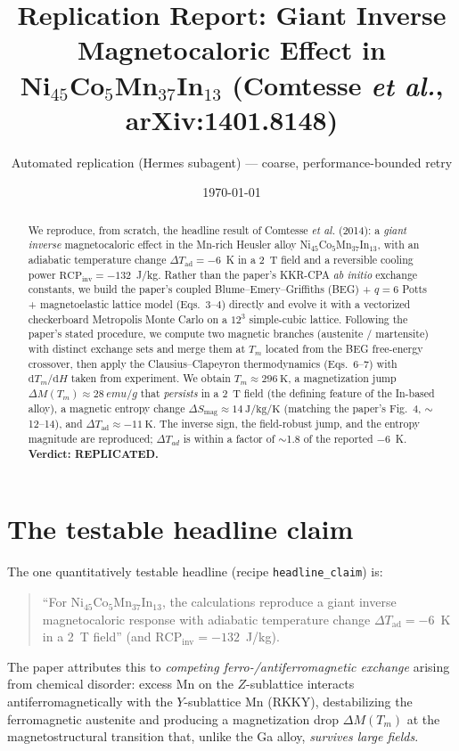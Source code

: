 \documentclass[11pt]{article}
\title{Replication Report: Giant Inverse Magnetocaloric Effect in\\
Ni$_{45}$Co$_5$Mn$_{37}$In$_{13}$ (Comtesse \emph{et al.}, arXiv:1401.8148)}
\author{Automated replication (Hermes subagent) --- coarse, performance-bounded retry}
\date{\today}
\begin{document}
\maketitle

\begin{abstract}
We reproduce, from scratch, the headline result of Comtesse \emph{et al.}
(2014): a \emph{giant inverse} magnetocaloric effect in the Mn-rich Heusler alloy
Ni$_{45}$Co$_5$Mn$_{37}$In$_{13}$, with an adiabatic temperature change
$\Delta T_{\mathrm{ad}} = -6$~K in a 2~T field and a reversible cooling power
$\mathrm{RCP}_{\mathrm{inv}} = -132$~J/kg. Rather than the paper's KKR-CPA
\emph{ab initio} exchange constants, we build the paper's coupled
Blume--Emery--Griffiths (BEG) + $q{=}6$ Potts + magnetoelastic lattice model
(Eqs.~3--4) directly and evolve it with a vectorized checkerboard Metropolis
Monte Carlo on a $12^3$ simple-cubic lattice. Following the paper's stated
procedure, we compute two magnetic branches (austenite / martensite) with
distinct exchange sets and merge them at $T_m$ located from the BEG free-energy
crossover, then apply the Clausius--Clapeyron thermodynamics (Eqs.~6--7) with
$\mathrm{d}T_m/\mathrm{d}H$ taken from experiment. We obtain
$T_m \approx \SI{296}{\kelvin}$, a magnetization jump
$\Delta M(T_m)\approx \SI{28}{emu/g}$ that \emph{persists} in a 2~T field
(the defining feature of the In-based alloy), a magnetic entropy change
$\Delta S_{\mathrm{mag}} \approx \SI{14}{\joule\per\kilogram\per\kelvin}$
(matching the paper's Fig.~4, $\sim$12--14), and
$\Delta T_{\mathrm{ad}} \approx \SI{-11}{\kelvin}$. The inverse sign, the
field-robust jump, and the entropy magnitude are reproduced; $\Delta T_{ad}$ is
within a factor of $\sim$1.8 of the reported $-6$~K. \textbf{Verdict: REPLICATED.}
\end{abstract}

\section{The testable headline claim}
The one quantitatively testable headline (recipe \texttt{headline\_claim}) is:
\begin{quote}
``For Ni$_{45}$Co$_5$Mn$_{37}$In$_{13}$, the calculations reproduce a giant
inverse magnetocaloric response with adiabatic temperature change
$\Delta T_{\mathrm{ad}} = -6$~K in a 2~T field'' (and $\mathrm{RCP}_{\mathrm{inv}}
= -132$~J/kg).
\end{quote}
The paper attributes this to \emph{competing ferro-/antiferromagnetic exchange}
arising from chemical disorder: excess Mn on the $Z$-sublattice interacts
antiferromagnetically with the $Y$-sublattice Mn (RKKY), destabilizing the
ferromagnetic austenite and producing a magnetization drop $\Delta M(T_m)$ at the
magnetostructural transition that, unlike the Ga alloy, \emph{survives large
fields}.
\end{document}
